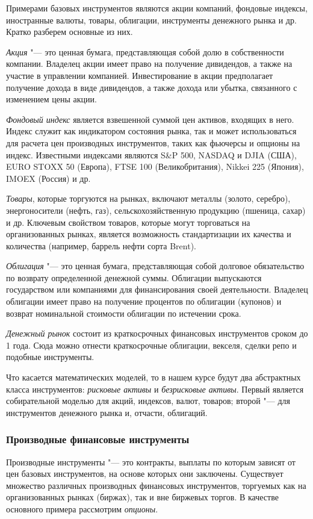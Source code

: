 Примерами базовых инструментов являются акции компаний, фондовые индексы, иностранные валюты, товары, облигации, инструменты денежного рынка и др.
Кратко разберем основные из них.

\emph{Акция} "--- это ценная бумага, представляющая собой долю в собственности компании.
Владелец акции имеет право на получение дивидендов, а также на участие в управлении компанией.
Инвестирование в акции предполагает получение дохода в виде дивидендов, а также дохода или убытка, связанного с изменением цены акции. 

\emph{Фондовый индекс} является взвешенной суммой цен активов, входящих в него.
Индекс служит как индикатором состояния рынка, так и может использоваться для расчета цен производных инструментов, таких как фьючерсы и опционы на индекс.
Известными индексами являются S\&P 500, NASDAQ и DJIA (США), EURO STOXX 50 (Европа), FTSE 100 (Великобритания), Nikkei 225 (Япония), IMOEX (Россия) и др.

\emph{Товары}, которые торгуются на рынках, включают металлы (золото, серебро), энергоносители (нефть, газ), сельскохозяйственную продукцию (пшеница, сахар) и др.
Ключевым свойством товаров, которые могут торговаться на организованных рынках, является возможность стандартизации их качества и количества (например, баррель нефти сорта Brent). 

\emph{Облигация} "--- это ценная бумага, представляющая собой долговое обязательство по возврату определенной денежной суммы.
Облигации выпускаются государством или компаниями для финансирования своей деятельности.
Владелец облигации имеет право на получение процентов по облигации (купонов) и возврат номинальной стоимости облигации по истечении срока.

\emph{Денежный рынок} состоит из краткосрочных финансовых инструментов сроком до 1 года.
Сюда можно отнести краткосрочные облигации, векселя, сделки репо и подобные инструменты.

Что касается математических моделей, то в нашем курсе будут два абстрактных класса инструментов: \emph{рисковые активы} и \emph{безрисковые активы}.
Первый является собирательной моделью для акций, индексов, валют, товаров; второй "--- для инструментов денежного рынка и, отчасти, облигаций. 


\subsubsection{Производные финансовые инструменты}

Производные инструменты "--- это контракты, выплаты по которым зависят от цен базовых инструментов, на основе которых они заключены. 
Существует множество различных производных финансовых инструментов, торгуемых как на организованных рынках (биржах), так и вне биржевых торгов.
В качестве основного примера рассмотрим \emph{опционы}.

